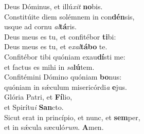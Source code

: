 \oddverse Deus Dóminus, et illú\textit{xit} \textbf{no}bis.\\
\evenverse Constitúite diem solémnem in con\textbf{dén}sis,~\*\\
\evenverse usque ad cornu \textit{al}\textbf{tá}ris.\\
\oddverse Deus meus es tu, et confitébor \textbf{ti}bi:~\*\\
\oddverse Deus meus es tu, et e\textit{xal}\textbf{tá}\textbf{bo} te.\\
\evenverse Confitébor tibi quóniam exau\textbf{dí}sti me:~\*\\
\evenverse et factus es mihi in \textit{sa}\textbf{lú}tem.\\
\oddverse Confitémini Dómino quóniam \textbf{bo}nus:~\*\\
\oddverse quóniam in sǽculum misericórdi\textit{a} \textbf{e}jus.\\
\evenverse Glória Patri, et \textbf{Fí}lio,~\*\\
\evenverse et Spirítu\textit{i} \textbf{San}cto.\\
\oddverse Sicut erat in princípio, et nunc, et \textbf{sem}per,~\*\\
\oddverse et in sǽcula sæculó\textit{rum}. \textbf{A}men.\\
